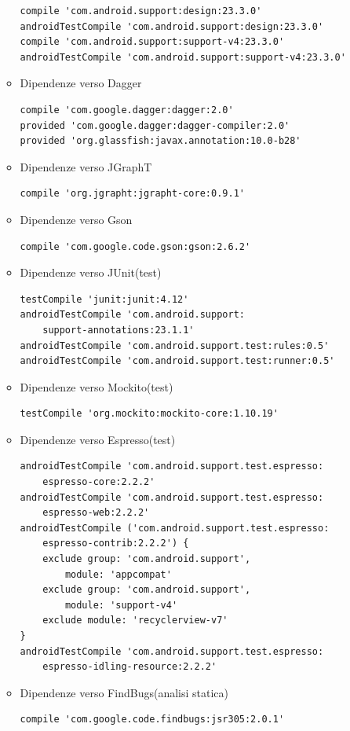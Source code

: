 \documentclass[../ManualeSviluppatore.tex]{subfiles}
\begin{document}
\begin{itemize}
\begin{itemize}
\begin{lstlisting}
compile 'com.android.support:design:23.3.0'
androidTestCompile 'com.android.support:design:23.3.0'
compile 'com.android.support:support-v4:23.3.0'
androidTestCompile 'com.android.support:support-v4:23.3.0'
						\end{lstlisting}
					\item Dipendenze verso Dagger
						\lstset{language=Java}
						\begin{lstlisting}
compile 'com.google.dagger:dagger:2.0'
provided 'com.google.dagger:dagger-compiler:2.0'
provided 'org.glassfish:javax.annotation:10.0-b28'
						\end{lstlisting}
					\item Dipendenze verso JGraphT
						\lstset{language=Java}
						\begin{lstlisting}
compile 'org.jgrapht:jgrapht-core:0.9.1'
						\end{lstlisting}
					\item Dipendenze verso Gson
						\lstset{language=Java}
						\begin{lstlisting}
compile 'com.google.code.gson:gson:2.6.2'
						\end{lstlisting}
					\item Dipendenze verso JUnit(test)
						\lstset{language=Java}
						\begin{lstlisting}
testCompile 'junit:junit:4.12'
androidTestCompile 'com.android.support:
	support-annotations:23.1.1'
androidTestCompile 'com.android.support.test:rules:0.5'
androidTestCompile 'com.android.support.test:runner:0.5'
						\end{lstlisting}
					\item Dipendenze verso Mockito(test)
						\lstset{language=Java}
						\begin{lstlisting}
testCompile 'org.mockito:mockito-core:1.10.19'
						\end{lstlisting}
					\item Dipendenze verso Espresso(test)
						\lstset{language=Java}
						\begin{lstlisting}
androidTestCompile 'com.android.support.test.espresso:
	espresso-core:2.2.2'
androidTestCompile 'com.android.support.test.espresso:
	espresso-web:2.2.2'
androidTestCompile ('com.android.support.test.espresso:
	espresso-contrib:2.2.2') {
    exclude group: 'com.android.support', 
    	module: 'appcompat'
    exclude group: 'com.android.support', 
    	module: 'support-v4'
    exclude module: 'recyclerview-v7'
}
androidTestCompile 'com.android.support.test.espresso:
	espresso-idling-resource:2.2.2'
						\end{lstlisting}
					\item Dipendenze verso FindBugs(analisi statica)
						\lstset{language=Java}
						\begin{lstlisting}
compile 'com.google.code.findbugs:jsr305:2.0.1'
						\end{lstlisting}

				\end{itemize}
		\end{itemize}
\end{document}
